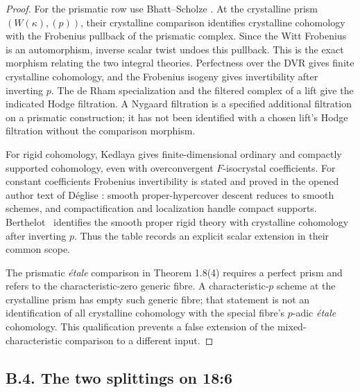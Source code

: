 \begin{proof}
For the prismatic row use Bhatt--Scholze
\cite[Theorem 1.8(1)--(6), Theorem 1.16 (=15.3),
Example 1.9(1)]{BhattScholzePrisms}. At the crystalline prism
$(W(\kappa),(p))$, their crystalline comparison identifies
crystalline cohomology with the Frobenius pullback of the
prismatic complex. Since the Witt Frobenius is an automorphism,
inverse scalar twist undoes this pullback. This is the exact
morphism relating the two integral theories. Perfectness over
the DVR gives finite crystalline cohomology, and the Frobenius
isogeny gives invertibility after inverting $p$. The de Rham
specialization and the filtered complex of a lift give the
indicated Hodge filtration. A Nygaard filtration is a specified
additional filtration on a prismatic construction; it has not
been identified with a chosen lift's Hodge filtration without
the comparison morphism.

For rigid cohomology, Kedlaya
\cite[Theorems 1.2.1--1.2.2]{Kedlaya2006} gives finite-dimensional
ordinary and compactly supported cohomology, even with
overconvergent $F$-isocrystal coefficients. For constant
coefficients Frobenius invertibility is stated and proved in
the opened author text of D\'eglise
\cite[Proposition 6.2 and Remark 6.3]{Deglise2005}: smooth
proper-hypercover descent reduces to smooth schemes, and
compactification and localization handle compact supports.
Berthelot~\cite[Proposition 1.9]{Berthelot1997} identifies the
smooth proper rigid theory with crystalline cohomology after
inverting $p$. Thus the table records an explicit scalar
extension in their common scope.

The prismatic \emph{\'etale} comparison in Theorem 1.8(4)
requires a perfect prism and refers to the characteristic-zero
generic fibre. A characteristic-$p$ scheme at the crystalline
prism has empty such generic fibre; that statement is not an
identification of all crystalline cohomology with the special
fibre's $p$-adic \emph{\'etale} cohomology. This qualification
prevents a false extension of the mixed-characteristic
comparison to a different input.
\end{proof}

\subsection{B.4. The two splittings on 18:6}


